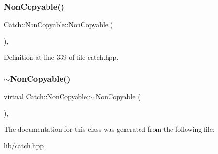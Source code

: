 \subsubsection{\texorpdfstring{Non\+Copyable()}{NonCopyable()}}
{\footnotesize\ttfamily Catch\+::\+Non\+Copyable\+::\+Non\+Copyable (\begin{DoxyParamCaption}{ }\end{DoxyParamCaption})\hspace{0.3cm}{\ttfamily [inline]}, {\ttfamily [protected]}}



Definition at line 339 of file catch.\+hpp.

\hypertarget{class_catch_1_1_non_copyable_a81254677280fef337eb4a676e91e3293}{}\label{class_catch_1_1_non_copyable_a81254677280fef337eb4a676e91e3293} 
\subsubsection{\texorpdfstring{$\sim$\+Non\+Copyable()}{~NonCopyable()}}
{\footnotesize\ttfamily virtual Catch\+::\+Non\+Copyable\+::$\sim$\+Non\+Copyable (\begin{DoxyParamCaption}{ }\end{DoxyParamCaption})\hspace{0.3cm}{\ttfamily [protected]}, {\ttfamily [virtual]}}



The documentation for this class was generated from the following file\+:\begin{DoxyCompactItemize}
\item 
lib/\hyperlink{catch_8hpp}{catch.\+hpp}\end{DoxyCompactItemize}
